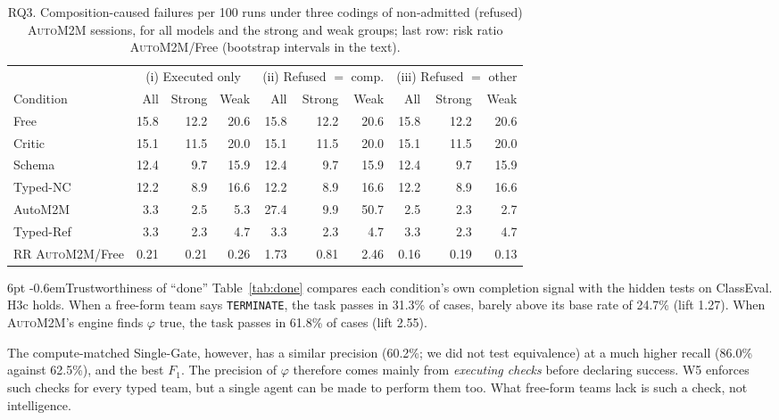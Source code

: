 \documentclass[pdflatex,sn-mathphys-num]{sn-jnl}
\makeatletter
\theoremstyle{thmstyleone}%
\theoremstyle{thmstyletwo}%
\theoremstyle{thmstylethree}%
\newcommand{\auto}{\textsc{AutoM2M}}
\newcommand{\W}[1]{\textsf{W#1}}
\newcommand{\code}[1]{\texttt{#1}}
\renewcommand\paragraph{\@startsection{paragraph}{4}{\z@}%
  {6pt \@plus 2pt \@minus 1pt}{-0.6em}{\normalfont\normalsize\bfseries}}
\makeatother
\begin{document}
\begin{table}[t]
\centering\scriptsize
\caption{RQ3. Composition-caused failures per 100 runs under three codings of
non-admitted (refused) \auto{} sessions, for all models and the strong and weak groups;
last row: risk ratio \auto{}/Free (bootstrap intervals in the text).}
\label{tab:compfail}
\setlength{\tabcolsep}{3pt}
\begin{tabular}{@{}l r r r r r r r r r@{}}
\toprule
& \multicolumn{3}{c}{(i) Executed only} & \multicolumn{3}{c}{(ii) Refused $=$ comp.} & \multicolumn{3}{c}{(iii) Refused $=$ other} \\
\cmidrule(lr){2-4}\cmidrule(lr){5-7}\cmidrule(l){8-10}
Condition & All & Strong & Weak & All & Strong & Weak & All & Strong & Weak \\
\midrule
Free & 15.8 & 12.2 & 20.6 & 15.8 & 12.2 & 20.6 & 15.8 & 12.2 & 20.6 \\
Critic & 15.1 & 11.5 & 20.0 & 15.1 & 11.5 & 20.0 & 15.1 & 11.5 & 20.0 \\
Schema & 12.4 & 9.7 & 15.9 & 12.4 & 9.7 & 15.9 & 12.4 & 9.7 & 15.9 \\
Typed-NC & 12.2 & 8.9 & 16.6 & 12.2 & 8.9 & 16.6 & 12.2 & 8.9 & 16.6 \\
AutoM2M & 3.3 & 2.5 & 5.3 & 27.4 & 9.9 & 50.7 & 2.5 & 2.3 & 2.7 \\
Typed-Ref & 3.3 & 2.3 & 4.7 & 3.3 & 2.3 & 4.7 & 3.3 & 2.3 & 4.7 \\
\midrule
RR \auto{}/Free & 0.21 & 0.21 & 0.26 & 1.73 & 0.81 & 2.46 & 0.16 & 0.19 & 0.13 \\
\bottomrule
\end{tabular}
\end{table}

\paragraph{Trustworthiness of ``done''} Table~\ref{tab:done} compares each
condition's own completion signal with the hidden tests on ClassEval. H3c holds.
When a free-form team says \code{TERMINATE}, the task passes in 31.3\% of
cases, barely above its base rate of 24.7\% (lift 1.27). When \auto{}'s engine
finds $\varphi$ true, the task passes in 61.8\% of cases (lift 2.55).

The compute-matched Single-Gate, however, has a similar precision (60.2\%; we did
not test equivalence) at a much higher recall (86.0\% against 62.5\%), and the
best $F_1$. The precision of $\varphi$ therefore comes mainly from
\emph{executing checks} before declaring success. \W{5} enforces such checks for
every typed team, but a single agent can be made to perform them too. What
free-form teams lack is such a check, not intelligence.
\end{document}
